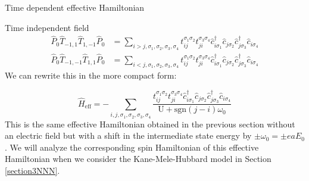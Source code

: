 \begin{section}{Time dependent effective Hamiltonian}
\begin{subsection}{Time independent field}
\begin{align*}
\hat{P}_0 \hat{T}_{-1,1} \hat{T}_{1,-1} \hat{P}_0 &= \sum_{i > j, \sigma_1, \sigma_2, \sigma_3, \sigma_4} t_{ij}^{\sigma_1 \sigma_2} t_{ji}^{\sigma_3 \sigma_4} \hat{c}_{i \sigma_1}^\dagger \hat{c}_{j \sigma_2} \hat{c}_{j \sigma_3}^\dagger \hat{c}_{i \sigma_4} \\
\hat{P}_0 \hat{T}_{-1,-1} \hat{T}_{1,1} \hat{P}_0 &= \sum_{i < j, \sigma_1, \sigma_2, \sigma_3, \sigma_4} t_{ij}^{\sigma_1 \sigma_2} t_{ji}^{\sigma_3 \sigma_4} \hat{c}_{i \sigma_1}^\dagger \hat{c}_{j \sigma_2} \hat{c}_{j \sigma_3}^\dagger \hat{c}_{i \sigma_4} 
\end{align*}
We can rewrite this in the more compact form:

\begin{equation}
\label{TimeIndepHeff}
\hat{H}_{\text{eff}} = -\sum_{i, j, \sigma_1, \sigma_2, \sigma_3, \sigma_4} \frac{t_{ij}^{\sigma_1 \sigma_2} t_{ji}^{\sigma_3 \sigma_4} \hat{c}_{i \sigma_1}^\dagger \hat{c}_{j \sigma_2} \hat{c}_{j \sigma_3}^\dagger \hat{c}_{i \sigma_4}}{\text{U} + \text{sgn}(j-i)\omega_0}
\end{equation}
This is the same effective Hamiltonian obtained in the previous section without an electric field but with a shift in the intermediate state energy by $\pm \omega_0 = \pm eaE_0$. We will analyze the corresponding spin Hamiltonian of this effective Hamiltonian when we consider the Kane-Mele-Hubbard model in Section \ref{section3NNN}.

\end{subsection}

\end{section}
